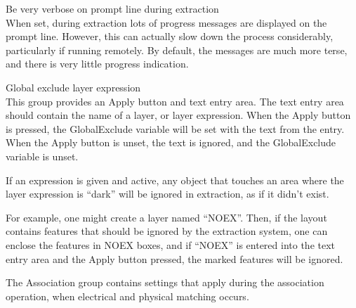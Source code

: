 \begin{description}
\item{\cb Be very verbose on prompt line during extraction}\\
When set, during extraction lots of progress messages are displayed on
the prompt line.  However, this can actually slow down the process
considerably, particularly if running remotely.  By default, the
messages are much more terse, and there is very little progress
indication.

\item{\cb Global exclude layer expression}\\
This group provides an {\cb Apply} button and text entry area.  The
text entry area should contain the name of a layer, or layer
expression.  When the {\cb Apply} button is pressed, the {\et
GlobalExclude} variable will be set with the text from the entry. 
When the {\cb Apply} button is unset, the text is ignored, and the
{\et GlobalExclude} variable is unset.

If an expression is given and active, any object that touches an area
where the layer expression is ``dark'' will be ignored in extraction,
as if it didn't exist.

For example, one might create a layer named ``{\vt NOEX}''.  Then, if
the layout contains features that should be ignored by the extraction
system, one can enclose the features in {\vt NOEX} boxes, and if
``{\vt NOEX}'' is entered into the text entry area and the {\cb Apply}
button pressed, the marked features will be ignored. 
\end{description}

The {\cb Association} group contains settings that apply during the
association operation, when electrical and physical matching occurs.

